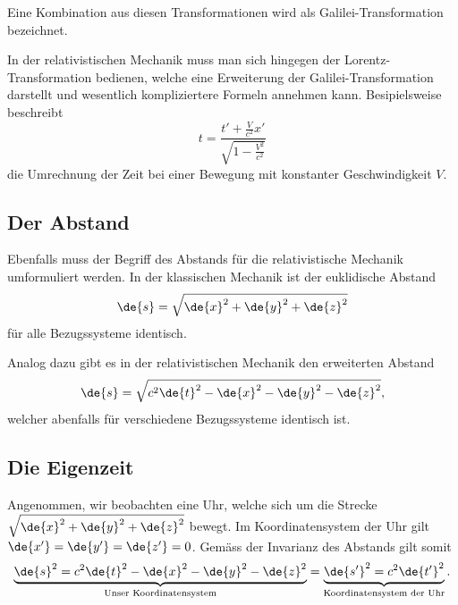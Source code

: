 Eine Kombination aus diesen Transformationen wird als Galilei-Transformation bezeichnet.

In der relativistischen Mechanik muss man sich hingegen der Lorentz-Transformation bedienen,
welche eine Erweiterung der Galilei-Transformation darstellt
und wesentlich kompliziertere Formeln annehmen kann. Besipielsweise beschreibt
\begin{equation}
    t = \frac{t' + \frac{V}{c^2}x'}{\sqrt{1-\frac{V^2}{c^2}}}
\end{equation}
die Umrechnung der Zeit bei einer Bewegung mit konstanter Geschwindigkeit \(V\).


\subsection{Der Abstand 
\label{relativ:section:abstand}}

Ebenfalls muss der Begriff des Abstands für die relativistische Mechanik umformuliert werden.
In der klassischen Mechanik ist der euklidische Abstand
\begin{equation}
    \de{s}=\sqrt{\de{x}^2 + \de{y}^2 + \de{z}^2}
\end{equation}
für alle Bezugssysteme identisch.

Analog dazu gibt es in der relativistischen Mechanik den erweiterten Abstand
\begin{equation}
    \de{s} = \sqrt{c^2\de{t}^2 - \de{x}^2 - \de{y}^2 - \de{z}^2},
\end{equation}
welcher abenfalls für verschiedene Bezugssysteme identisch ist.


\subsection{Die Eigenzeit 
\label{relativ:section:eigenzeit}}

Angenommen, wir beobachten eine Uhr, welche sich um die Strecke
\(\sqrt{\de{x}^2 + \de{y}^2 + \de{z}^2}\)
bewegt.
Im Koordinatensystem der Uhr gilt
\(\de{x'} = \de{y'} = \de{z'} = 0\).
Gemäss der Invarianz des Abstands gilt somit
\begin{equation*}
    \underbrace{\de{s}^2 = c^2\de{t}^2 - \de{x}^2 - \de{y}^2 - \de{z}^2}_{\text{Unser Koordinatensystem}}
        = \underbrace{\de{s'}^2 = c^2\de{t'}^2}_{\text{Koordinatensystem der Uhr}} .
\end{equation*}
